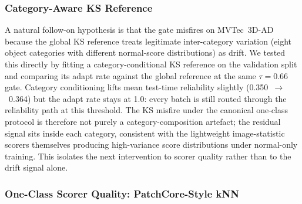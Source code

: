\documentclass[10pt,conference]{IEEEtran}
\begin{document}
\subsubsection{Category-Aware KS Reference}
\label{sec:mvtec-category-aware}

A natural follow-on hypothesis is that the gate misfires on MVTec~3D-AD because
the global KS reference treats legitimate inter-category variation (eight object
categories with different normal-score distributions) as drift. We tested this
directly by fitting a category-conditional KS reference on the validation split
and comparing its adapt rate against the global reference at the same
$\tau=0.66$ gate.
Category conditioning lifts mean test-time reliability slightly
(0.350~$\to$~0.364) but the adapt rate stays at 1.0: every batch is still routed
through the reliability path at this threshold. The KS misfire under the
canonical one-class protocol is therefore not purely a category-composition
artefact; the residual signal sits inside each category, consistent with the
lightweight image-statistic scorers themselves producing high-variance score
distributions under normal-only training. This isolates the next intervention
to scorer quality rather than to the drift signal alone.

\subsubsection{One-Class Scorer Quality: PatchCore-Style kNN}
\label{sec:mvtec-patchcore}
\end{document}
